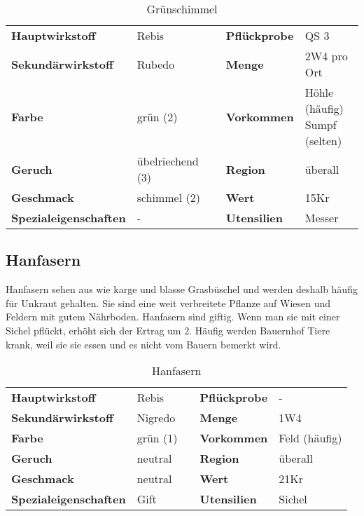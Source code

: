 \begin{table}[h] 
\begin{center} 
\begin{tabular}{|l|l|p{1cm}|l|l|} 
  	\cline{1-2} \cline{4-5} 
  	\textbf{Hauptwirkstoff} & Rebis && \textbf{Pflückprobe} & QS 3 \\ \cline{1-2} \cline{4-5} 
  	\textbf{Sekundärwirkstoff} & Rubedo && \textbf{Menge} & 2W4 pro Ort \\ \cline{1-2} \cline{4-5} 
  	\textbf{Farbe} & grün (2) && \textbf{Vorkommen} & \brcell{Höhle (häufig) \\ Sumpf (selten)} \\ \cline{1-2} \cline{4-5} 
  	\textbf{Geruch} & übelriechend (3) && \textbf{Region} & überall \\ \cline{1-2} \cline{4-5} 
  	\textbf{Geschmack} & schimmel (2) && \textbf{Wert} & 15Kr \\ \cline{1-2} \cline{4-5} 
  	\textbf{Spezialeigenschaften} & - && \textbf{Utensilien} & Messer \\ \cline{1-2} \cline{4-5} 
\end{tabular} 
\end{center} 
\caption{Grünschimmel} 
\label{tab:gruenschimmel} 
\end{table}


\subsection{Hanfasern}
Hanfasern sehen aus wie karge und blasse Grasbüschel und werden deshalb häufig für Unkraut gehalten. Sie sind eine weit verbreitete Pflanze auf Wiesen und Feldern mit gutem Nährboden. Hanfasern sind giftig. Wenn man sie mit einer Sichel pflückt, erhöht sich der Ertrag um 2. Häufig werden Bauernhof Tiere krank, weil sie sie essen und es nicht vom Bauern bemerkt wird.

\begin{table}[h] 
\begin{center} 
\begin{tabular}{|l|l|p{1cm}|l|l|} 
  	\cline{1-2} \cline{4-5} 
  	\textbf{Hauptwirkstoff} & Rebis && \textbf{Pflückprobe} & - \\ \cline{1-2} \cline{4-5} 
  	\textbf{Sekundärwirkstoff} & Nigredo && \textbf{Menge} & 1W4 \\ \cline{1-2} \cline{4-5} 
  	\textbf{Farbe} & grün (1) && \textbf{Vorkommen} & Feld (häufig) \\ \cline{1-2} \cline{4-5} 
  	\textbf{Geruch} & neutral && \textbf{Region} & überall \\ \cline{1-2} \cline{4-5} 
  	\textbf{Geschmack} & neutral && \textbf{Wert} & 21Kr \\ \cline{1-2} \cline{4-5} 
  	\textbf{Spezialeigenschaften} & Gift && \textbf{Utensilien} & Sichel \\ \cline{1-2} \cline{4-5} 
\end{tabular} 
\end{center} 
\caption{Hanfasern} 
\label{tab:hanfasern} 
\end{table}


